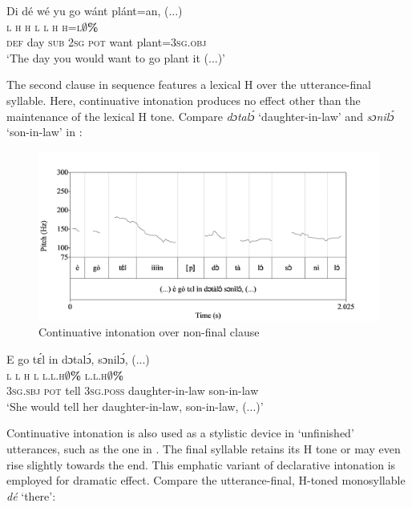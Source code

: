 \ea%
    \label{ex:key:93}
    \glll   Di  dé  wé  yu  go  wánt  plánt=an,  (...)\\
\textsc{l}  \textsc{h}  \textsc{h}  \textsc{l}  \textsc{l}  \textsc{h}    \textsc{h=l}\textbf{\textsc{${\emptyset}$}}\textbf{\textsc{\%}}\\
\textsc{def}  day  \textsc{sub}  \textsc{2sg}  \textsc{pot}  want  plant=\textsc{3sg.obj}\\
\glt ‘The day you would want to go plant it (...)’      
\z

The second clause in sequence features a lexical H over the utterance-final syllable. Here, continuative intonation produces no effect other than the maintenance of the lexical H tone. Compare \textit{dɔtalɔ́} ‘daughter-in-law’ and \textit{sɔnilɔ́} ‘son-in-law’ in : 

\begin{figure}
\caption{Continuative intonation over non-final clause}
\label{fig:key:3.41}
\includegraphics[height=.3\textheight]{figures/yakpomod-img43.png}
\end{figure}

\ea%
    \label{ex:key:94}
    \glll   E    go  tɛ́l  in    dɔtalɔ́,      sɔnilɔ́,  (...)\\
\textsc{l}    \textsc{l}  \textsc{h}  \textsc{l}    \textsc{l.l.h}\textbf{\textsc{${\emptyset}$}}\textbf{\textsc{\%}}      \textsc{l.l.h}\textbf{\textsc{${\emptyset}$}}\textbf{\textsc{\%}}\\
\textsc{3sg.sbj}  \textsc{pot}  tell  \textsc{3sg.poss}  daughter-in-law  son-in-law\\
\glt ‘She would tell her daughter-in-law, son-in-law, (...)’  
\z


Continuative intonation is also used as a stylistic device in ‘unfinished’\textstyleannotationreference{} utterances, such as the one in . The final syllable retains its H tone or may even rise slightly towards the end. This emphatic variant of declarative intonation is employed for dramatic effect. Compare the utterance-final, H-toned monosyllable \textit{dé} ‘there’: 

